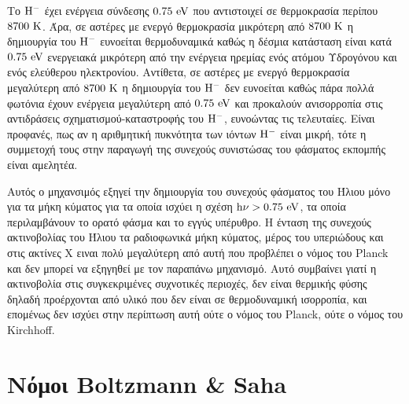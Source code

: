 Το $\rm H^{-}$ έχει ενέργεια σύνδεσης $\rm 0.75 \ eV$ που αντιστοιχεί σε θερμοκρασία περίπου $\rm 8700 \ K$. Άρα, σε αστέρες με ενεργό θερμοκρασία μικρότερη από $\rm 8700 \ K$ η δημιουργία του $\rm H^{-}$ ευνοείται θερμοδυναμικά καθώς η δέσμια κατάσταση είναι κατά $\rm 0.75 \ eV$ ενεργειακά μικρότερη από την ενέργεια ηρεμίας ενός ατόμου Υδρογόνου και ενός ελεύθερου ηλεκτρονίου. Αντίθετα, σε αστέρες με ενεργό θερμοκρασία μεγαλύτερη από $\rm 8700 \ K$ η δημιουργία του $\rm H^{-}$ δεν ευνοείται καθώς πάρα πολλά φωτόνια έχουν ενέργεια μεγαλύτερη από $\rm 0.75 \ eV$ και προκαλούν ανισορροπία στις αντιδράσεις σχηματισμού-καταστροφής του $\rm H^{-}$, ευνοώντας τις τελευταίες. Είναι προφανές, πως αν η αριθμητική πυκνότητα των ιόντων $\rm H^{-}$ είναι μικρή, τότε η συμμετοχή τους στην παραγωγή της συνεχούς συνιστώσας του φάσματος εκπομπής είναι αμελητέα.

Αυτός ο μηχανσιμός εξηγεί την δημιουργία του συνεχούς φάσματος του Ήλιου μόνο για τα μήκη κύματος για τα οποία ισχύει η σχέση $\rm h\nu > 0.75 \ eV$, τα οποία περιλαμβάνουν το ορατό φάσμα και το εγγύς υπέρυθρο. Η ένταση της συνεχούς ακτινοβολίας του Ήλιου τα ραδιοφωνικά μήκη κύματος, μέρος του υπεριώδους και στις ακτίνες Χ ειναι πολύ μεγαλύτερη από αυτή που προβλέπει ο νόμος του Planck και δεν μπορεί να εξηγηθεί με τον παραπάνω μηχανισμό. Αυτό συμβαίνει γιατί η ακτινοβολία στις συγκεκριμένες συχνοτικές περιοχές, δεν είναι θερμικής φύσης δηλαδή προέρχονται από υλικό που δεν είναι σε θερμοδυναμική ισορροπία, και επομένως δεν ισχύει στην περίπτωση αυτή ούτε ο νόμος του Planck, ούτε ο νόμος του Kirchhoff.



\section{Νόμοι Boltzmann \& Saha}
